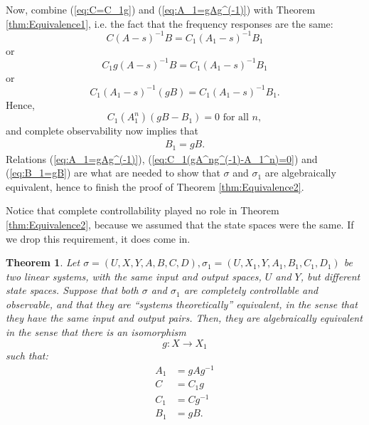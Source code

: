 \documentclass[12pt]{book}
\theoremstyle{plain}
\newtheorem{theorem}{Theorem}[section]
\theoremstyle{definition}
\begin{document}
Now, combine (\ref{eq:C=C_1g}) and (\ref{eq:A_1=gAg^(-1)}) with Theorem \ref{thm:Equivalence1}, i.e. the fact that the frequency responses are the same:
$$C(A-s)^{-1}B = C_1(A_1-s)^{-1}B_1$$
or
$$C_1g(A-s)^{-1}B = C_1(A_1-s)^{-1}B_1$$
or
$$C_1(A_1-s)^{-1}(gB) = C_1(A_1-s)^{-1}B_1.$$
Hence,
$$C_1(A_1^n)(gB-B_1) = 0 \text{ for all } n,$$
and complete observability now implies that
\begin{align} \label{eq:B_1=gB}
    B_1 = gB.
\end{align}
Relations (\ref{eq:A_1=gAg^(-1)}), (\ref{eq:C_1(gA^ng^(-1)-A_1^n)=0}) and (\ref{eq:B_1=gB}) are what are needed to show that $\sigma$ and $\sigma_1$ are algebraically equivalent, hence to finish the proof of Theorem \ref{thm:Equivalence2}.

Notice that complete controllability played no role in Theorem \ref{thm:Equivalence2}, because we assumed that the state spaces were the same.
If we drop this requirement, it does come in.

\begin{theorem} \label{thm:Equivalence3}
    Let $\sigma = (U, X, Y, A, B, C, D), \sigma_1 = (U, X_1, Y, A_1, B_1, C_1, D_1)$ be two linear systems, with the same input and output spaces, $U$ and $Y$, but different state spaces.
    Suppose that both $\sigma$ and $\sigma_1$ are completely controllable and observable, and that they are ``systems theoretically'' equivalent, in the sense that they have the same input and output pairs.
    Then, they are algebraically equivalent in the sense that there is an isomorphism
    $$g: X \to X_1$$
    such that:
    \begin{align}
        A_1 &= gAg^{-1} \\
        C &= C_1g \\
        C_1 &= Cg^{-1} \\
        B_1 &= gB.
    \end{align}
\end{theorem}
\end{document}
